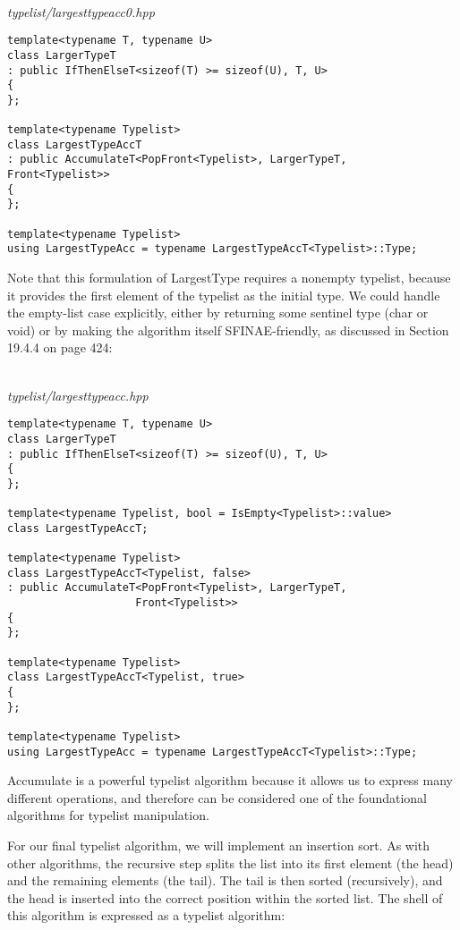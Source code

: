 \hspace*{\fill} \\ %
\noindent
\textit{typelist/largesttypeacc0.hpp}
\begin{lstlisting}[style=styleCXX]
template<typename T, typename U>
class LargerTypeT
: public IfThenElseT<sizeof(T) >= sizeof(U), T, U>
{
};

template<typename Typelist>
class LargestTypeAccT
: public AccumulateT<PopFront<Typelist>, LargerTypeT,
Front<Typelist>>
{
};

template<typename Typelist>
using LargestTypeAcc = typename LargestTypeAccT<Typelist>::Type;
\end{lstlisting}

Note that this formulation of LargestType requires a nonempty typelist, because it provides the first element of the typelist as the initial type. We could handle the empty-list case explicitly, either by returning some sentinel type (char or void) or by making the algorithm itself SFINAE-friendly, as discussed in Section 19.4.4 on page 424:

\hspace*{\fill} \\ %
\noindent
\textit{typelist/largesttypeacc.hpp}
\begin{lstlisting}[style=styleCXX]
template<typename T, typename U>
class LargerTypeT
: public IfThenElseT<sizeof(T) >= sizeof(U), T, U>
{
};

template<typename Typelist, bool = IsEmpty<Typelist>::value>
class LargestTypeAccT;

template<typename Typelist>
class LargestTypeAccT<Typelist, false>
: public AccumulateT<PopFront<Typelist>, LargerTypeT,
					Front<Typelist>>
{
};

template<typename Typelist>
class LargestTypeAccT<Typelist, true>
{
};

template<typename Typelist>
using LargestTypeAcc = typename LargestTypeAccT<Typelist>::Type;
\end{lstlisting}

Accumulate is a powerful typelist algorithm because it allows us to express many different operations, and therefore can be considered one of the foundational algorithms for typelist manipulation.


For our final typelist algorithm, we will implement an insertion sort. As with other algorithms, the recursive step splits the list into its first element (the head) and the remaining elements (the tail). The tail is then sorted (recursively), and the head is inserted into the correct position within the sorted list. The shell of this algorithm is expressed as a typelist algorithm:

